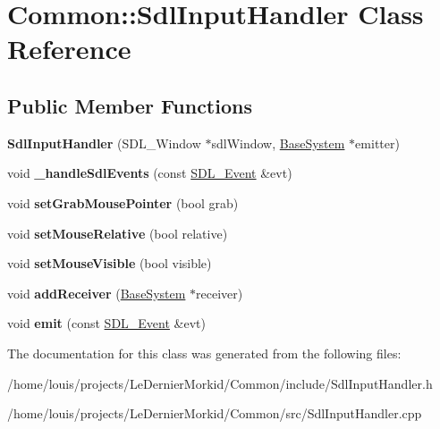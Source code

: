 \hypertarget{class_common_1_1_sdl_input_handler}{}\section{Common\+:\+:Sdl\+Input\+Handler Class Reference}
\label{class_common_1_1_sdl_input_handler}
\subsection*{Public Member Functions}
\begin{DoxyCompactItemize}
\item 
\mbox{\label{class_common_1_1_sdl_input_handler_ac90801d445e5c31dcd2b965ca3eaef53}} 
{\bfseries Sdl\+Input\+Handler} (S\+D\+L\+\_\+\+Window $\ast$sdl\+Window, \hyperlink{class_common_1_1_base_system}{Base\+System} $\ast$emitter)
\item 
\mbox{\label{class_common_1_1_sdl_input_handler_a24ecda74ffbdad833809ec916ca5aa36}} 
void {\bfseries \+\_\+handle\+Sdl\+Events} (const \hyperlink{union_s_d_l___event}{S\+D\+L\+\_\+\+Event} \&evt)
\item 
\mbox{\label{class_common_1_1_sdl_input_handler_af59f3d8f841492da0d58d70a7194d18a}} 
void {\bfseries set\+Grab\+Mouse\+Pointer} (bool grab)
\item 
\mbox{\label{class_common_1_1_sdl_input_handler_a93f3c75fde51291eb985afbc1877dfb7}} 
void {\bfseries set\+Mouse\+Relative} (bool relative)
\item 
\mbox{\label{class_common_1_1_sdl_input_handler_ac866cdab398f7fe1c2f77d186bb08d17}} 
void {\bfseries set\+Mouse\+Visible} (bool visible)
\item 
\mbox{\label{class_common_1_1_sdl_input_handler_aa1a7c47e721048e1103db4038571f5c3}} 
void {\bfseries add\+Receiver} (\hyperlink{class_common_1_1_base_system}{Base\+System} $\ast$receiver)
\item 
\mbox{\label{class_common_1_1_sdl_input_handler_ac906f60b05f1593089322cfdaeab72b3}} 
void {\bfseries emit} (const \hyperlink{union_s_d_l___event}{S\+D\+L\+\_\+\+Event} \&evt)
\end{DoxyCompactItemize}


The documentation for this class was generated from the following files\+:\begin{DoxyCompactItemize}
\item 
/home/louis/projects/\+Le\+Dernier\+Morkid/\+Common/include/Sdl\+Input\+Handler.\+h\item 
/home/louis/projects/\+Le\+Dernier\+Morkid/\+Common/src/Sdl\+Input\+Handler.\+cpp\end{DoxyCompactItemize}
